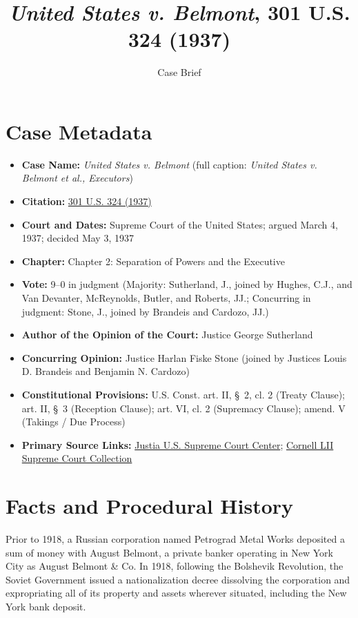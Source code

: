 \documentclass[12pt]{article}
\title{\textit{United States v. Belmont}, 301 U.S. 324 (1937)}
\author{Case Brief}
\date{}
\begin{document}
\maketitle

\section{Case Metadata}

\begin{itemize}
  \item \textbf{Case Name:} \textit{United States v. Belmont} (full caption: \textit{United States v. Belmont et al., Executors})
  \item \textbf{Citation:} \href{https://supreme.justia.com/cases/federal/us/301/324/}{301 U.S. 324 (1937)}
  \item \textbf{Court and Dates:} Supreme Court of the United States; argued March 4, 1937; decided May 3, 1937
  \item \textbf{Chapter:} Chapter 2: Separation of Powers and the Executive
  \item \textbf{Vote:} 9--0 in judgment (Majority: Sutherland, J., joined by Hughes, C.J., and Van Devanter, McReynolds, Butler, and Roberts, JJ.; Concurring in judgment: Stone, J., joined by Brandeis and Cardozo, JJ.)
  \item \textbf{Author of the Opinion of the Court:} Justice George Sutherland
  \item \textbf{Concurring Opinion:} Justice Harlan Fiske Stone (joined by Justices Louis D. Brandeis and Benjamin N. Cardozo)
  \item \textbf{Constitutional Provisions:} U.S. Const. art. II, \S~2, cl. 2 (Treaty Clause); art. II, \S~3 (Reception Clause); art. VI, cl. 2 (Supremacy Clause); amend. V (Takings / Due Process)
  \item \textbf{Primary Source Links:} \href{https://supreme.justia.com/cases/federal/us/301/324/}{Justia U.S. Supreme Court Center}; \href{https://www.law.cornell.edu/supremecourt/text/301/324}{Cornell LII Supreme Court Collection}
\end{itemize}

\section{Facts and Procedural History}

Prior to 1918, a Russian corporation named Petrograd Metal Works deposited a sum of money with August Belmont, a private banker operating in New York City as August Belmont \& Co. In 1918, following the Bolshevik Revolution, the Soviet Government issued a nationalization decree dissolving the corporation and expropriating all of its property and assets wherever situated, including the New York bank deposit.
\end{document}
